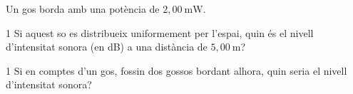 Un gos borda amb una potència de $2,00\ \mathrm{mW}$.

\begin{apartat}{1}
Si aquest so es distribueix uniformement per l'espai, quin és el nivell d'intensitat sonora (en dB) a una distància de $5,00\ \mathrm{m}$?
\end{apartat}

\begin{apartat}{1}
Si en comptes d'un gos, fossin dos gossos bordant alhora, quin seria el nivell d'intensitat sonora?
\end{apartat}

